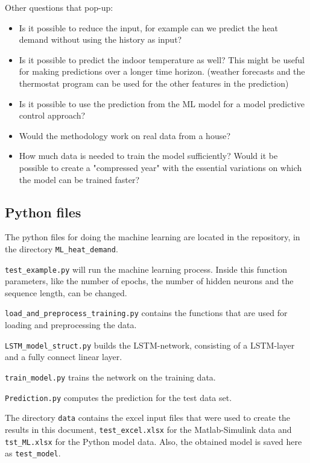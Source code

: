 Other questions that pop-up:
\begin{itemize}
\item Is it possible to reduce the input, for example can we predict the heat demand without using the history as input?
\item Is it possible to predict the indoor temperature as well? This might be useful for making predictions over a longer time horizon. (weather forecasts and the thermostat program can be used for the other features in the prediction)  
\item Is it possible to use the prediction from the ML model for a model predictive control approach?
\item Would the methodology work on real data from a house? 
\item How much data is needed to train the model sufficiently? Would it be possible to create a "compressed year" with the essential variations on which the model can be trained faster? 
\end{itemize}


\subsection{Python files}
The python files for doing the machine learning are located in the repository, in the directory \texttt{ML\_heat\_demand}. 

\texttt{test\_example.py} will run the machine learning process. Inside this function parameters, like the number of epochs, the number of hidden neurons and the sequence length, can be changed. 

\texttt{load\_and\_preprocess\_training.py} contains the functions that are used for loading and preprocessing the data. 

\texttt{LSTM\_model\_struct.py} builds the LSTM-network, consisting of a LSTM-layer and a fully connect linear layer. 

\texttt{train\_model.py} trains the network on the training data. 

\texttt{Prediction.py} computes the prediction for the test data set. 

The directory \texttt{data} contains the excel input files that were used to create the results in this document, \texttt{test\_excel.xlsx} for the Matlab-Simulink data and \texttt{tst\_ML.xlsx} for the Python model data. Also, the obtained model is saved here as \texttt{test\_model}.

